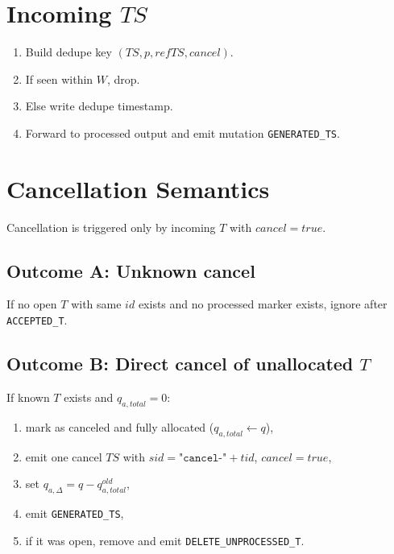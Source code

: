 \documentclass[sigconf]{acmart}
\begin{document}
\section{Incoming $TS$}
\begin{enumerate}[leftmargin=*]
  \item Build dedupe key $(TS,p,refTS,cancel)$.
  \item If seen within $W$, drop.
  \item Else write dedupe timestamp.
  \item Forward to processed output and emit mutation \texttt{GENERATED\_TS}.
\end{enumerate}

\section{Cancellation Semantics}\label{sec:cancellation}
Cancellation is triggered only by incoming $T$ with $cancel=true$.

\subsection{Outcome A: Unknown cancel}
If no open $T$ with same $id$ exists and no processed marker exists, ignore after \texttt{ACCEPTED\_T}.

\subsection{Outcome B: Direct cancel of unallocated $T$}
If known $T$ exists and $q_{a,total}=0$:
\begin{enumerate}[leftmargin=*]
  \item mark as canceled and fully allocated ($q_{a,total}\gets q$),
  \item emit one cancel $TS$ with $sid=\texttt{"cancel-"}+tid$, $cancel=true$,
  \item set $q_{a,\Delta}=q-q_{a,total}^{old}$,
  \item emit \texttt{GENERATED\_TS},
  \item if it was open, remove and emit \texttt{DELETE\_UNPROCESSED\_T}.
\end{enumerate}
\end{document}
